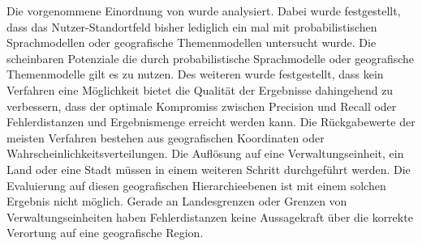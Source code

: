 		Die vorgenommene Einordnung von \cite{Schulz2013} wurde analysiert. 
		Dabei wurde festgestellt, dass das Nutzer-Standortfeld bisher lediglich ein mal mit probabilistischen Sprachmodellen oder geografische Themenmodellen untersucht wurde.
		Die scheinbaren Potenziale die durch probabilistische Sprachmodelle oder geografische Themenmodelle gilt es zu nutzen.
		Des weiteren wurde festgestellt, dass kein Verfahren eine Möglichkeit bietet die Qualität der Ergebnisse dahingehend zu verbessern, dass der optimale Kompromiss zwischen Precision und Recall oder Fehlerdistanzen und Ergebnismenge erreicht werden kann.
		Die Rückgabewerte der meisten Verfahren bestehen aus geografischen Koordinaten oder Wahrscheinlichkeitsverteilungen. 
		Die Auflösung auf eine Verwaltungseinheit, ein Land oder eine Stadt müssen in einem weiteren Schritt durchgeführt werden.
		Die Evaluierung auf diesen geografischen Hierarchieebenen ist mit einem solchen Ergebnis nicht möglich. 
		Gerade an Landesgrenzen oder Grenzen von Verwaltungseinheiten haben Fehlerdistanzen keine Aussagekraft über die korrekte Verortung auf eine geografische Region.







